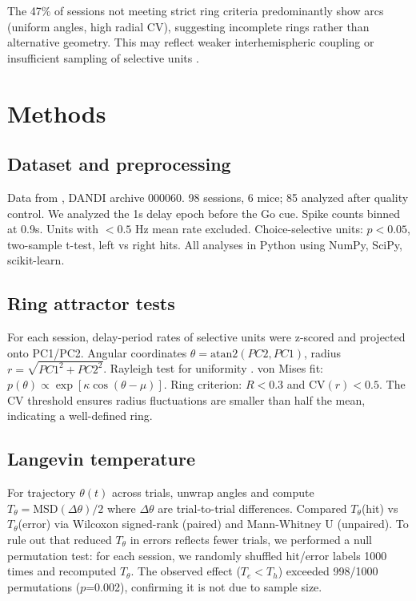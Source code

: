 \documentclass[11pt,a4paper]{article}
\begin{document}
The 47\% of sessions not meeting strict ring criteria predominantly show arcs (uniform angles, high radial CV), suggesting incomplete rings rather than alternative geometry. This may reflect weaker interhemispheric coupling or insufficient sampling of selective units \citep{erlich2011distinct,kopec2011cortical}.

\section{Methods}

\subsection{Dataset and preprocessing}
Data from \citet{churchland2019single}, DANDI archive 000060. 98 sessions, 6 mice; 85 analyzed after quality control. We analyzed the 1s delay epoch before the Go cue. Spike counts binned at 0.9s. Units with \texorpdfstring{$<0.5$}{<0.5} Hz mean rate excluded. Choice-selective units: \texorpdfstring{$p<0.05$}{p<0.05}, two-sample t-test, left vs right hits. All analyses in Python using NumPy, SciPy, scikit-learn.

\subsection{Ring attractor tests}
For each session, delay-period rates of selective units were z-scored and projected onto PC1/PC2. Angular coordinates \texorpdfstring{$\theta=\text{atan2}(PC2,PC1)$}{theta=atan2(PC2,PC1)}, radius \texorpdfstring{$r=\sqrt{PC1^2 + PC2^2}$}{r=sqrt(PC1^2+PC2^2)}. Rayleigh test for uniformity \citep{fisher1993statistical}. von Mises fit: \texorpdfstring{$p(\theta)\propto\exp[\kappa\cos(\theta-\mu)]$}{p(theta) prop exp[kappa cos(theta-mu)]}. Ring criterion: \texorpdfstring{$R<0.3$}{R<0.3} and CV\texorpdfstring{$(r)<0.5$}{(r)<0.5}. The CV threshold ensures radius fluctuations are smaller than half the mean, indicating a well-defined ring.

\subsection{Langevin temperature}
For trajectory \texorpdfstring{$\theta(t)$}{theta(t)} across trials, unwrap angles and compute \texorpdfstring{$T_\theta = \text{MSD}(\Delta\theta)/2$}{T_theta = MSD(Delta theta)/2} where \texorpdfstring{$\Delta\theta$}{Delta theta} are trial-to-trial differences. Compared \texorpdfstring{$T_\theta$}{T_theta}(hit) vs \texorpdfstring{$T_\theta$}{T_theta}(error) via Wilcoxon signed-rank (paired) and Mann-Whitney U (unpaired). To rule out that reduced \texorpdfstring{$T_\theta$}{T_theta} in errors reflects fewer trials, we performed a null permutation test: for each session, we randomly shuffled hit/error labels 1000 times and recomputed \texorpdfstring{$T_\theta$}{T_theta}. The observed effect (\texorpdfstring{$T_e < T_h$}{T_e < T_h}) exceeded 998/1000 permutations (\texorpdfstring{$p$}{p}=0.002), confirming it is not due to sample size.
\end{document}
